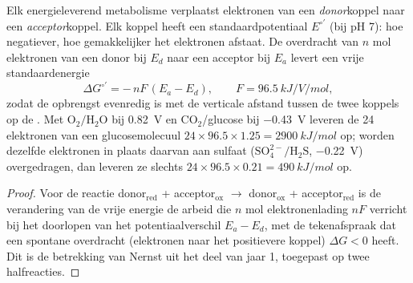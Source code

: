 \begin{theorem}\label{thm:b2:microbial-metabolism:redox}
Elk energieleverend metabolisme verplaatst elektronen van een
\emph{donor}koppel naar een \emph{acceptor}koppel. Elk koppel heeft een
standaardpotentiaal $E^{\circ\prime}$ (bij pH 7): hoe negatiever, hoe
gemakkelijker het elektronen afstaat. De overdracht van $n$ mol
elektronen van een donor bij $E_d$ naar een acceptor bij $E_a$ levert
een vrije standaardenergie
\[
\Delta G^{\circ\prime} = -\,n F\,(E_a - E_d), \qquad F = \qty{96.5}{kJ/V/mol},
\]
zodat de opbrengst evenredig is met de verticale afstand tussen de twee
koppels op de \emph{}. Met
$\mathrm{O_2/H_2O}$ bij \qty{+0.82}{V} en $\mathrm{CO_2}$/glucose bij
\qty{-0.43}{V} leveren de 24 elektronen van een glucosemolecuul
$24\times 96.5\times 1.25 = \qty{2900}{kJ/mol}$ op; worden dezelfde
elektronen in plaats daarvan aan sulfaat ($\mathrm{SO_4^{2-}/H_2S}$,
\qty{-0.22}{V}) overgedragen, dan leveren ze slechts
$24\times 96.5\times 0.21 = \qty{490}{kJ/mol}$ op.
\end{theorem}
\begin{proof}
Voor de reactie donor$_{\text{red}}$ + acceptor$_{\text{ox}}$
$\to$ donor$_{\text{ox}}$ + acceptor$_{\text{red}}$ is de verandering
van de vrije energie de arbeid die $n$ mol elektronenlading $nF$
verricht bij het doorlopen van het potentiaalverschil $E_a - E_d$, met
de tekenafspraak dat een spontane overdracht (elektronen naar het
positievere koppel) $\Delta G < 0$ heeft. Dit is de betrekking van
Nernst uit het deel van jaar 1, toegepast op twee halfreacties.
\end{proof}


